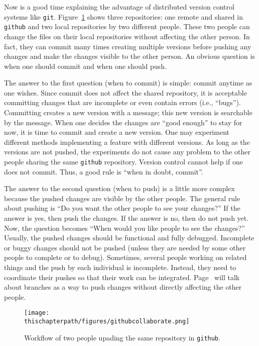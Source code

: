 Now is a good time explaining the advantage of distributed version
control systems like {\tt git}.  Figure~\ref{fig:githubcollaborate}
shows three repositories: one remote and shared in {\tt github} and
two local repositories by two different people. These two people can
change the files on their local repositories without affecting the
other person.  In fact, they can commit many times creating multiple
versions before pushing any changes and make the changes visible to
the other person.  An obvious question is when one should commit
and when one should push.

The answer to the first question (when to commit) is simple: commit
anytime as one wishes.  Since commit does not affect the shared
repository, it is acceptable committing changes that are incomplete or
even contain errors (i.e., ``bugs''). Committing creates a new version
with a message; this new version is searchable by the message.  When
one decides the changes are ``good enough'' to stay for now, it is
time to commit and create a new version.  One may experiment different
methods implementing a feature with different versions. As long as the
versions are not pushed, the experiments do not cause any problem to
the other people sharing the same {\tt github} repository.  Version
control cannot help if one does not commit. Thus, a good rule is
``when in doubt, commit''.

\label{page:whengitpush}
The answer to the second question (when to push) is a little more
complex because the pushed changes are visible by the other people.
The general rule about pushing is ``Do you want the other people to
see your changes?''  If the answer is yes, then push the changes.  If
the answer is no, then do not push yet.  Now, the question becomes
``When would you like people to see the changes?''  Usually, the
pushed changes should be functional and fully debugged.  Incomplete or
buggy changes should not be pushed (unless they are needed by some
other people to complete or to debug).  Sometimes, several people
working on related things and the push by each individual is
incomplete. Instead, they need to coordinate their pushes so that
their work can be integrated.
Page~\pageref{section:git:branches} will talk about branches as a way
to push changes without directly affecting the other people.

\begin{figure}[h] \centering
{\texttt{[image: \\thischapterpath/figures/githubcollaborate.png]}}
\caption{Workflow of two people upading the same repository in {\tt github}.}
\label{fig:githubcollaborate}
\end{figure}

